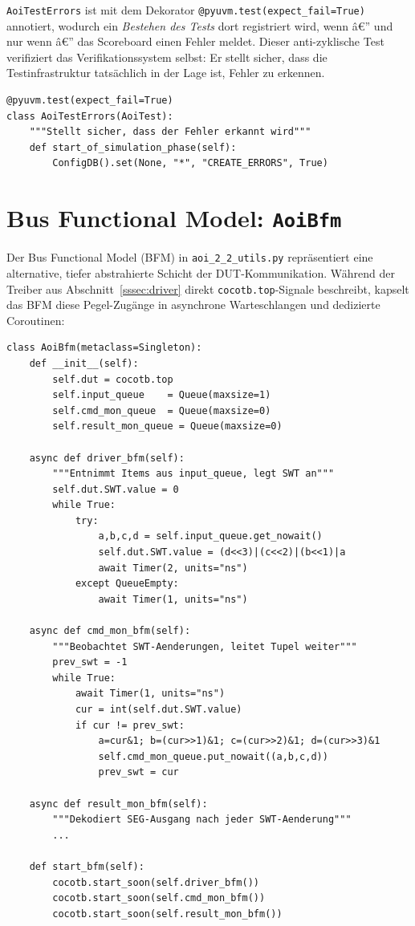 ﻿\documentclass[12pt,a4paper]{report}
\begin{document}
\texttt{AoiTestErrors} ist mit dem Dekorator \texttt{@pyuvm.test(expect\_fail=True)}
annotiert, wodurch ein \emph{Bestehen des Tests} dort registriert wird,
wenn â€” und nur wenn â€” das Scoreboard einen Fehler meldet. Dieser anti-zyklische
Test verifiziert das Verifikationssystem selbst: Er stellt sicher, dass die
Testinfrastruktur tatsächlich in der Lage ist, Fehler zu erkennen.

\begin{lstlisting}[style=pythonstyle, caption={Fehlerinjektions-Test \texttt{AoiTestErrors}}]
@pyuvm.test(expect_fail=True)
class AoiTestErrors(AoiTest):
    """Stellt sicher, dass der Fehler erkannt wird"""
    def start_of_simulation_phase(self):
        ConfigDB().set(None, "*", "CREATE_ERRORS", True)
\end{lstlisting}

\section{Bus Functional Model: \texttt{AoiBfm}}
\label{subsec:bfm}

Der Bus Functional Model (BFM) in \texttt{aoi\_2\_2\_utils.py} repräsentiert
eine alternative, tiefer abstrahierte Schicht der DUT-Kommunikation. Während
der Treiber aus Abschnitt~\ref{sssec:driver} direkt \texttt{cocotb.top}-Signale
beschreibt, kapselt das BFM diese Pegel-Zugänge in asynchrone Warteschlangen
und dedizierte Coroutinen:

\begin{lstlisting}[style=pythonstyle, caption={BFM-Struktur mit Schreib- und Überwachungs-Koroutinen}]
class AoiBfm(metaclass=Singleton):
    def __init__(self):
        self.dut = cocotb.top
        self.input_queue    = Queue(maxsize=1)
        self.cmd_mon_queue  = Queue(maxsize=0)
        self.result_mon_queue = Queue(maxsize=0)

    async def driver_bfm(self):
        """Entnimmt Items aus input_queue, legt SWT an"""
        self.dut.SWT.value = 0
        while True:
            try:
                a,b,c,d = self.input_queue.get_nowait()
                self.dut.SWT.value = (d<<3)|(c<<2)|(b<<1)|a
                await Timer(2, units="ns")
            except QueueEmpty:
                await Timer(1, units="ns")

    async def cmd_mon_bfm(self):
        """Beobachtet SWT-Aenderungen, leitet Tupel weiter"""
        prev_swt = -1
        while True:
            await Timer(1, units="ns")
            cur = int(self.dut.SWT.value)
            if cur != prev_swt:
                a=cur&1; b=(cur>>1)&1; c=(cur>>2)&1; d=(cur>>3)&1
                self.cmd_mon_queue.put_nowait((a,b,c,d))
                prev_swt = cur

    async def result_mon_bfm(self):
        """Dekodiert SEG-Ausgang nach jeder SWT-Aenderung"""
        ...

    def start_bfm(self):
        cocotb.start_soon(self.driver_bfm())
        cocotb.start_soon(self.cmd_mon_bfm())
        cocotb.start_soon(self.result_mon_bfm())
\end{lstlisting}
\end{document}
